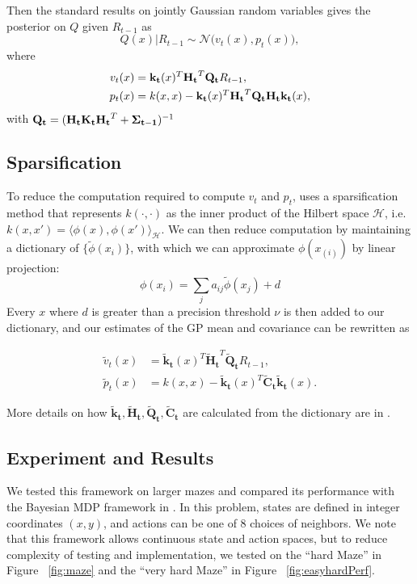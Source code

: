\documentclass[10pt, twocolumn, twoside]{article}
\begin{document}
Then the standard results on jointly Gaussian random variables gives the posterior on $Q$ given
$R_{t-1}$ as
\begin{equation}
Q(x)|R_{t-1} \sim \mathcal{N}\big(v_t(x), p_t(x)\big),
\end{equation}
where
\begin{align*}
v_t(x) &= \mathbf{k_t}(x)^T \mathbf{H_t}^T \mathbf{Q_t} R_{t-1},\\
p_t(x) &= k(x, x) - \mathbf{k_t}(x)^T \mathbf{H_t}^T \mathbf{Q_t} \mathbf{H_t} \mathbf{k_t}(x),
\end{align*}
with $\mathbf{Q_t} = (\mathbf{H_t}\mathbf{K_t}\mathbf{H_t}^T + \mathbf{\Sigma_{t-1}})^{-1}$

\subsection{Sparsification}
To reduce the computation required to compute $v_t$ and $p_t$, \cite{engel} uses a sparsification
method that represents $k(\cdot, \cdot)$ as the inner product of the Hilbert space $\mathcal{H}$, i.e.
$k(x, x') = \langle \phi(x), \phi(x') \rangle_{\mathcal{H}}$. We can then reduce computation by maintaining
a dictionary of $\{\tilde{\phi}(x_i)\}$, with which we can approximate $\phi(x_{(i)})$ by linear projection:
$$\phi(x_i) = \sum_j a_{ij} \tilde{\phi}(x_j) + d$$
Every $x$ where $d$ is greater than a precision threshold $\nu$ is then added to our dictionary, and
our estimates of the GP mean and covariance can be rewritten as

\newcommand{\ktilde}{\mathbf{\tilde{k}_t}}
\newcommand{\Htilde}{\mathbf{\tilde{H}_t}}
\newcommand{\Qtilde}{\mathbf{\tilde{Q}_t}}
\newcommand{\Ctilde}{\mathbf{\tilde{C}_t}}

\begin{align*}
\tilde{v}_t(x) &= \ktilde(x)^T \Htilde^T \Qtilde R_{t-1},\\
\tilde{p}_t(x) &= k(x, x) - \ktilde(x)^T \Ctilde \ktilde(x).
\end{align*}

More details on how $\ktilde, \Htilde, \Qtilde, \Ctilde$ are calculated from the dictionary are in
\cite{engels}.

\subsection{Experiment and Results}
We tested this framework on larger mazes and compared its performance with the Bayesian MDP framework
in \cite{strens}. In this problem, states are defined in integer coordinates $(x, y)$, and actions can
be one of 8 choices of neighbors. We note that this framework allows continuous state and action spaces, 
but to reduce complexity of testing and implementation, we tested on the ``hard Maze'' in Figure
~\ref{fig:maze} and the ``very hard Maze'' in Figure ~\ref{fig:easyhardPerf}.
\end{document}
